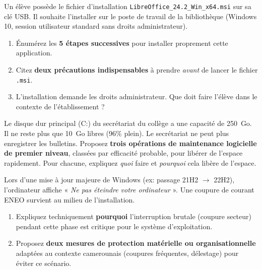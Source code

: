 \documentclass[11pt]{article}
\newcounter{popsec}
\newcounter{popsub}
\newcommand{\courssub}[1]{%
  \stepcounter{popsub}%
  \par\vspace{9pt}\noindent{\popxbold\fontsize{11.5}{13}\selectfont\color{popink}{\color{poporange}\thepopsec.\thepopsub}\hspace{6pt}#1}\par\nopagebreak\vspace{4pt}
}
\begin{document}
\begin{exercice}
Un élève possède le fichier d'installation \texttt{LibreOffice\_24.2\_Win\_x64.msi} sur sa clé USB. Il souhaite l'installer sur le poste de travail de la bibliothèque (Windows 10, session utilisateur standard sans droits administrateur).
\begin{enumerate}
    \item Énumérez les \textbf{5 étapes successives} pour installer proprement cette application.
    \item Citez \textbf{deux précautions indispensables} à prendre \emph{avant} de lancer le fichier \texttt{.msi}.
    \item L'installation demande les droits administrateur. Que doit faire l'élève dans le contexte de l'établissement ?
\end{enumerate}
\end{exercice}

\begin{exercice}
Le disque dur principal (C:) du secrétariat du collège a une capacité de \SI{250}{Go}. Il ne reste plus que \SI{10}{Go} libres (96\% plein). Le secrétariat ne peut plus enregistrer les bulletins.
Proposez \textbf{trois opérations de maintenance logicielle de premier niveau}, classées par efficacité probable, pour libérer de l'espace rapidement. Pour chacune, expliquez \emph{quoi} faire et \emph{pourquoi} cela libère de l'espace.
\end{exercice}

\begin{exercice}
Lors d'une mise à jour majeure de Windows (ex: passage 21H2 $\to$ 22H2), l'ordinateur affiche « \emph{Ne pas éteindre votre ordinateur} ». Une coupure de courant ENEO survient au milieu de l'installation.
\begin{enumerate}
    \item Expliquez techniquement \textbf{pourquoi} l'interruption brutale (coupure secteur) pendant cette phase est critique pour le système d'exploitation.
    \item Proposez \textbf{deux mesures de protection matérielle ou organisationnelle} adaptées au contexte camerounais (coupures fréquentes, délestage) pour éviter ce scénario.
\end{enumerate}
\end{exercice}

\courssub{Je me prépare au Probatoire}
\end{document}
